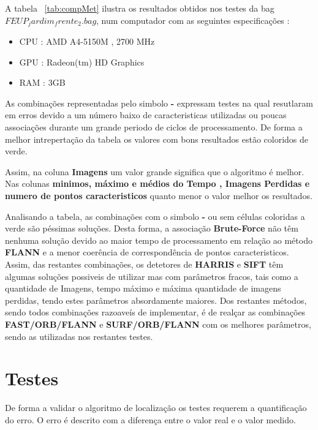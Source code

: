 A tabela ~\ref{tab:compMet} ilustra os resultados obtidos nos testes da bag \textit{$FEUP_jardim_frente_2.bag$}, num computador com as seguintes especificações :
\begin{itemize}
	\item CPU : AMD A4-5150M , 2700 MHz
	\item GPU : Radeon(tm) HD Graphics
	\item RAM : 3GB 
\end{itemize}


 As combinações representadas pelo simbolo \textbf{-} expressam testes na qual resutlaram em erros devido a um número baixo de caracteristicas utilizadas ou poucas associações durante um grande periodo de ciclos de processamento. De forma a melhor intrepertação da tabela os valores com bons resultados estão coloridos de verde. 


Assim, na coluna \textbf{Imagens} um valor grande significa que o algoritmo é melhor. Nas colunas \textbf{minimos, máximo e médios do Tempo , Imagens Perdidas e numero de pontos caracteristicos} quanto menor o valor melhor os resultados. 

Analisando a tabela, as combinações com o simbolo \textbf{-} ou sem células coloridas a verde são péssimas soluções. Desta forma, a associação \textbf{Brute-Force} não têm nenhuma solução devido ao maior tempo de processamento em relação ao método \textbf{FLANN} e a menor coerência de correspondência de pontos caracteristicos. Assim, das restantes combinações, os detetores de \textbf{HARRIS} e \textbf{SIFT} têm algumas soluções possiveis de utilizar mas com parâmetros fracos, tais como a quantidade de Imagens, tempo máximo e máxima quantidade de imagens perdidas, tendo estes parâmetros absordamente maiores. Dos restantes métodos, sendo todos combinações razoaveís de implementar, é de realçar as combinações \textbf{FAST/ORB/FLANN} e \textbf{SURF/ORB/FLANN} com os melhores parâmetros, sendo as utilizadas nos restantes testes.








\section{Testes}

De forma a validar o algoritmo de localização os testes requerem a quantificação do erro. O erro é descrito com a diferença entre o valor real e o valor medido.

